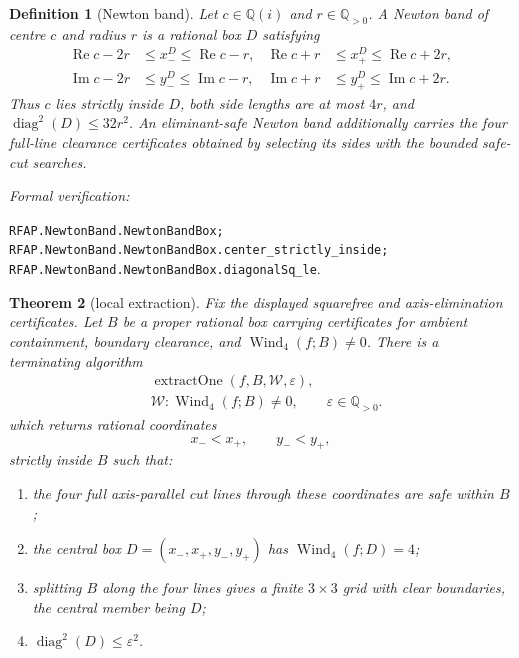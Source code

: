 \documentclass[11pt]{article}
\newtheorem{theorem}{Theorem}[section]
\newtheorem{definition}[theorem]{Definition}
\newcommand{\Qi}{\mathbb{Q}(i)}
\newcommand{\Q}{\mathbb{Q}}
\newcommand{\Ree}{\operatorname{Re}}
\newcommand{\Imm}{\operatorname{Im}}
\newcommand{\Wind}{\operatorname{Wind}}
\newcommand{\diamq}{\operatorname{diag}^{2}}
\newcommand{\eps}{\varepsilon}
\newcommand{\leanref}[1]{\par\smallskip\noindent
  \emph{Formal verification:}\par\nobreak
  {\raggedright\nolinkurl{#1}.\par}}
\begin{document}
\begin{definition}[Newton band]
\label{def:newton-band}
Let $c\in\Qi$ and $r\in\Q_{>0}$.  A \emph{Newton band} of centre $c$ and
radius $r$ is a rational box $D$ satisfying
\[
\begin{aligned}
 \Ree c-2r&\le x_-^D\le\Ree c-r,
 &\Ree c+r&\le x_+^D\le\Ree c+2r,\\
 \Imm c-2r&\le y_-^D\le\Imm c-r,
 &\Imm c+r&\le y_+^D\le\Imm c+2r.
\end{aligned}
\]
Thus $c$ lies strictly inside $D$, both side lengths are at most $4r$, and
$\diamq(D)\le32r^2$.  An \emph{eliminant-safe Newton band} additionally
carries the four full-line clearance certificates obtained by selecting its
sides with the bounded safe-cut searches.
\end{definition}

\leanref{RFAP.NewtonBand.NewtonBandBox;
RFAP.NewtonBand.NewtonBandBox.center_strictly_inside;
RFAP.NewtonBand.NewtonBandBox.diagonalSq_le}

\begin{theorem}[local extraction]
\label{thm:extract-one}
Fix the displayed squarefree and axis-elimination certificates.  Let $B$ be
a proper rational box carrying certificates for ambient containment,
boundary clearance, and $\Wind_4(f;B)\ne0$.  There is a terminating algorithm
\[
 \begin{aligned}
 &\operatorname{extractOne}(f,B,\mathcal W,\eps),\\
 &\mathcal W:\Wind_4(f;B)\ne0,\qquad \eps\in\Q_{>0}.
 \end{aligned}
\]
which returns rational coordinates
\[
       x_-<x_+,
       \qquad y_-<y_+,
\]
strictly inside $B$ such that:
\begin{enumerate}[label=(\alph*)]
\item the four full axis-parallel cut lines through these coordinates are safe within $B$;
\item the central box $D=(x_-,x_+,y_-,y_+)$ has $\Wind_4(f;D)=4$;
\item splitting $B$ along the four lines gives a finite $3\times3$ grid with clear boundaries, the central member being $D$;
\item $\diamq(D)\le\eps^2$.
\end{enumerate}
\end{theorem}
\end{document}
